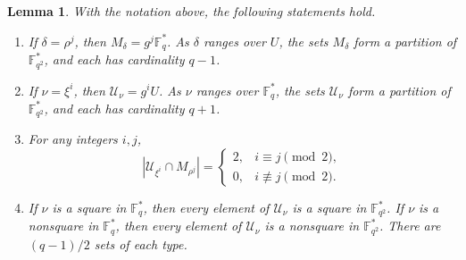 \documentclass[preprint,12pt,a4paper]{elsarticle}
\newtheorem{lemma}[theorem]{Lemma}
\begin{document}
\begin{lemma}\label{lem:coset-intersections}
With the notation above, the following statements hold.
\begin{enumerate}[label=\textup{(\roman*)}]
\item If $\delta=\rho^j$, then $M_\delta=g^j\mathbb F_q^{*}$. As $\delta$ ranges over $U$, the sets $M_\delta$ form a partition of $\mathbb F_{q^2}^{*}$, and each has cardinality $q-1$.
\item If $\nu=\xi^i$, then $\mathcal U_\nu=g^iU$. As $\nu$ ranges over $\mathbb F_q^{*}$, the sets $\mathcal U_\nu$ form a partition of $\mathbb F_{q^2}^{*}$, and each has cardinality $q+1$.
\item For any integers $i,j$,
\[
 |\mathcal U_{\xi^i}\cap M_{\rho^j}|=
 \begin{cases}
 2,&i\equiv j\pmod2,\\
 0,&i\not\equiv j\pmod2.
 \end{cases}
\]
\item If $\nu$ is a square in $\mathbb F_q^{*}$, then every element of $\mathcal U_\nu$ is a square in $\mathbb F_{q^2}^{*}$. If $\nu$ is a nonsquare in $\mathbb F_q^{*}$, then every element of $\mathcal U_\nu$ is a nonsquare in $\mathbb F_{q^2}^{*}$. There are $(q-1)/2$ sets of each type.
\end{enumerate}
\end{lemma}
\end{document}
